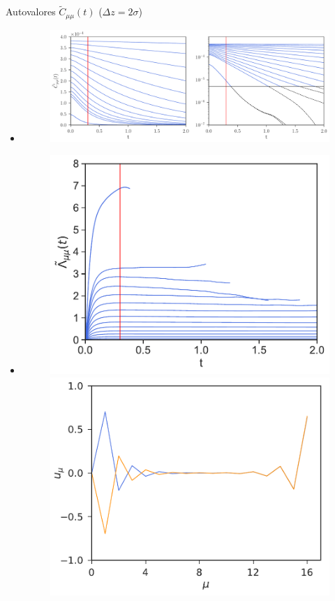 \documentclass{beamer}
\begin{document}
\begin{frame}{Autovalores $\tilde{C}_{\mu\mu}(t)$ ($\Delta z=2\sigma$)}
  \begin{itemize}
    \item<1->[]
\begin{figure}[h!]
  \includegraphics[width=0.97\linewidth]{CtRec-WALLS-17nodes-exp}
\end{figure}
    \item<2->[]
\begin{figure}[h!]
\includegraphics[scale=0.315]{LambdatRec-WALLS-17nodes}
\includegraphics[scale=0.315]{Eigenvectors-WALLS-17nodes}
\end{figure}
  \end{itemize}
\end{frame}
\end{document}
